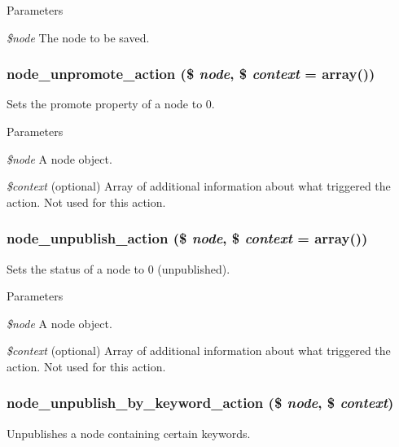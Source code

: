 \begin{DoxyParams}{Parameters}
\item[{\em \$node}]The node to be saved. \end{DoxyParams}
\hypertarget{group__actions_ga8f13fd18828b94e3736a39264149f927}{
\subsubsection[{node\_\-unpromote\_\-action}]{\setlength{\rightskip}{0pt plus 5cm}node\_\-unpromote\_\-action (\$ {\em node}, \/  \$ {\em context} = {\ttfamily array()})}}
\label{group__actions_ga8f13fd18828b94e3736a39264149f927}
Sets the promote property of a node to 0.


\begin{DoxyParams}{Parameters}
\item[{\em \$node}]A node object. \item[{\em \$context}](optional) Array of additional information about what triggered the action. Not used for this action. \end{DoxyParams}
\hypertarget{group__actions_ga93d63f63526d64026ebdd5fc6572f5ab}{
\subsubsection[{node\_\-unpublish\_\-action}]{\setlength{\rightskip}{0pt plus 5cm}node\_\-unpublish\_\-action (\$ {\em node}, \/  \$ {\em context} = {\ttfamily array()})}}
\label{group__actions_ga93d63f63526d64026ebdd5fc6572f5ab}
Sets the status of a node to 0 (unpublished).


\begin{DoxyParams}{Parameters}
\item[{\em \$node}]A node object. \item[{\em \$context}](optional) Array of additional information about what triggered the action. Not used for this action. \end{DoxyParams}
\hypertarget{group__actions_gaa453e8f47436b80070213abd851535d0}{
\subsubsection[{node\_\-unpublish\_\-by\_\-keyword\_\-action}]{\setlength{\rightskip}{0pt plus 5cm}node\_\-unpublish\_\-by\_\-keyword\_\-action (\$ {\em node}, \/  \$ {\em context})}}
\label{group__actions_gaa453e8f47436b80070213abd851535d0}
Unpublishes a node containing certain keywords.


